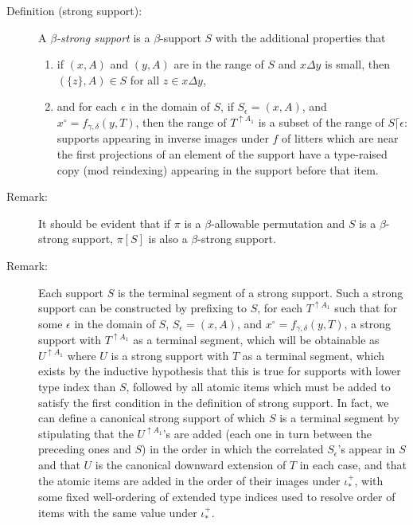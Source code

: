 \documentclass[112pt]{article}
\begin{document}
\begin{description}

\item[Definition (strong support):]  A {\em $\beta$-strong support\/} is a $\beta$-support $S$ with the additional properties that

\begin{enumerate}

\item if $(x,A)$ and $(y,A)$ are in the range of $S$ and $x \Delta y$ is small, then $(\{z\},A) \in S$ for all $z \in x \Delta y$, 

\item and for each $\epsilon$ in the domain of $S$, if $S_\epsilon = (x,A)$, and $x^\circ = f_{\gamma,\delta}(y,T)$, then the range of $T^{\uparrow A_1}$ is a subset of the range of $S \lceil \epsilon$:  supports appearing in inverse images under $f$ of litters which are near the first projections of an element of the support have a type-raised copy (mod reindexing) appearing in the support before that item.
\end{enumerate}


\item[Remark:]  It should be evident that if $\pi$ is a $\beta$-allowable permutation and $S$ is a $\beta$-strong support,
$\pi[S]$ is also a $\beta$-strong support.

\item[Remark:]  Each support $S$ is the terminal segment of a strong support.  Such a strong support can be constructed by prefixing to $S$, for each $T^{\uparrow A_1}$ such that for some $\epsilon$ in the domain of $S$, $S_\epsilon = (x,A)$, and $x^\circ = f_{\gamma,\delta}(y,T)$, a strong support with $T^{\uparrow A_1}$ as a terminal segment, which will be obtainable as $U^{\uparrow A_1}$ where $U$ is a strong support with $T$ as a terminal segment, which exists by the inductive hypothesis that this is true for supports with lower type index than $S$, followed by all atomic items which must be added to satisfy the first condition in the definition of strong support.   In fact, we can define a canonical strong support of which $S$ is a terminal segment by stipulating that the $U^{\uparrow A_1}$'s are added (each one in turn between the preceding ones and $S$)  in the order in which the correlated
$S_\epsilon$'s appear in $S$ and that $U$ is the canonical downward extension of $T$ in each case, and that the atomic items are added in the order of their images under $\iota^+_*$, with some fixed well-ordering of extended type indices used to resolve order of items with the same value under $\iota^+_*$.


\end{description}
\end{document}
